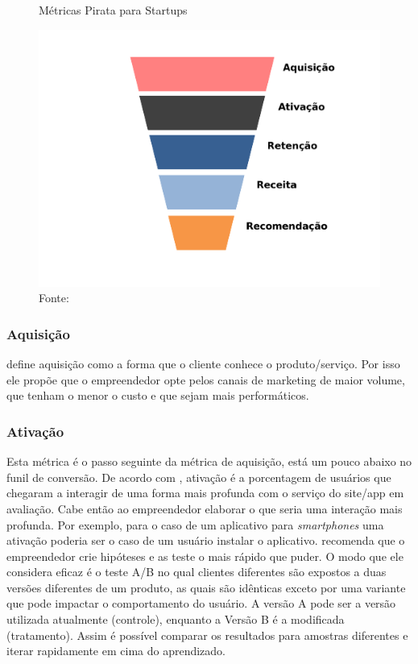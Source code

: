 \begin{figure}[H]
\caption{Métricas Pirata para Startups}
\centerline{\includegraphics[scale=0.25]{img/metricas_pirata}}
\label{fig:metricas_pirata}
\caption* {Fonte: }
\end{figure}


\subsubsection{Aquisição}
\label{cha:aquisicao}
 define aquisição como a forma que o cliente conhece o produto/serviço. Por isso ele propõe que o empreendedor opte pelos canais de marketing de maior volume, que tenham o menor o custo e que sejam mais performáticos.

\subsubsection{Ativação}
\label{cha:ativacao}
Esta métrica é o passo seguinte da métrica de aquisição, está um pouco abaixo no funil de conversão. De acordo com , ativação é a porcentagem de usuários que chegaram a interagir de uma forma mais profunda com o serviço do site/app em avaliação. Cabe então ao empreendedor elaborar o que seria uma interação mais profunda. Por exemplo, para o caso de um aplicativo para \textit{smartphones} uma ativação poderia ser o caso de um usuário instalar o aplicativo.
 recomenda que o empreendedor crie hipóteses e as teste o mais rápido que puder. O modo que ele considera eficaz é o teste A/B no qual clientes diferentes são expostos a  duas versões diferentes de um produto, as quais são idênticas exceto por uma variante que pode impactar o comportamento do usuário. A versão A pode ser a versão utilizada atualmente (controle), enquanto a Versão B é a modificada (tratamento). Assim é possível comparar os resultados para amostras diferentes e iterar rapidamente em cima do aprendizado.

